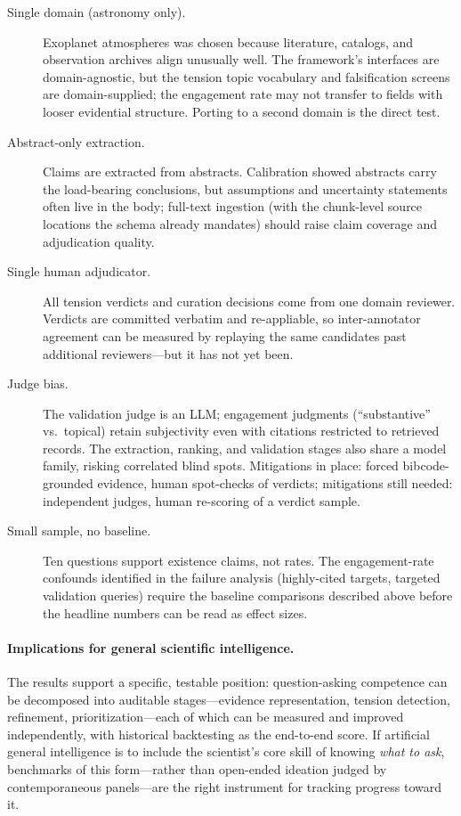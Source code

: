 \begin{description}
  \item[Single domain (astronomy only).] Exoplanet atmospheres was
    chosen because literature, catalogs, and observation archives align
    unusually well. The framework's interfaces are domain-agnostic, but
    the tension topic vocabulary and falsification screens are
    domain-supplied; the engagement rate may not transfer to fields with
    looser evidential structure. Porting to a second domain is the
    direct test.
  \item[Abstract-only extraction.] Claims are extracted from abstracts.
    Calibration showed abstracts carry the load-bearing conclusions, but
    assumptions and uncertainty statements often live in the body;
    full-text ingestion (with the chunk-level source locations the
    schema already mandates) should raise claim coverage and
    adjudication quality.
  \item[Single human adjudicator.] All tension verdicts and curation
    decisions come from one domain reviewer. Verdicts are committed
    verbatim and re-appliable, so inter-annotator agreement can be
    measured by replaying the same candidates past additional
    reviewers---but it has not yet been.
  \item[Judge bias.] The validation judge is an LLM; engagement
    judgments (``substantive'' vs.\ topical) retain subjectivity even
    with citations restricted to retrieved records. The extraction,
    ranking, and validation stages also share a model family, risking
    correlated blind spots. Mitigations in place: forced bibcode-grounded
    evidence, human spot-checks of verdicts; mitigations still needed:
    independent judges, human re-scoring of a verdict sample.
  \item[Small sample, no baseline.] Ten questions support existence
    claims, not rates. The engagement-rate confounds identified in the
    failure analysis (highly-cited targets, targeted validation queries)
    require the baseline comparisons described above before the headline
    numbers can be read as effect sizes.
\end{description}

\paragraph{Implications for general scientific intelligence.}
The results support a specific, testable position: question-asking
competence can be decomposed into auditable stages---evidence
representation, tension detection, refinement, prioritization---each of
which can be measured and improved independently, with historical
backtesting as the end-to-end score. If artificial general intelligence
is to include the scientist's core skill of knowing \emph{what to ask},
benchmarks of this form---rather than open-ended ideation judged by
contemporaneous panels---are the right instrument for tracking progress
toward it.